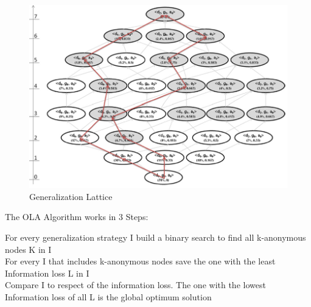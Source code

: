 \documentclass{llncs}
\begin{document}
\begin{figure}
	\centering
	\includegraphics[width=1.0\textwidth]{lattice.png}
	\caption{Generalization Lattice}%
	\label{lattice}
\end{figure}


\begin{algorithm}[H]
\caption{The OLA Algorithm works in 3 Steps:}
{
For every generalization strategy I build a binary search to find all k-anonymous nodes K in I\\
For every I that includes k-anonymous nodes save the one with the least Information loss L in I\\
Compare I to respect of the information loss. The one with the lowest Information loss of all L is the global optimum solution\\
}
\end{algorithm}
\end{document}
